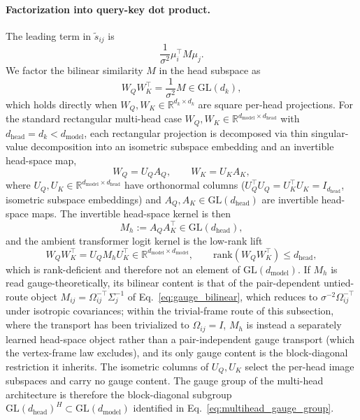 \documentclass[11pt]{article}
\begin{document}
\paragraph{Factorization into query-key dot product.}
The leading term in $\tilde{s}_{ij}$ is
\begin{equation}
\frac{1}{\sigma^2}\mu_i^\top M \mu_j.
\end{equation}
We factor the bilinear similarity $M$ in the head subspace as
\begin{equation}
W_Q W_K^\top = \frac{1}{\sigma^2} M \in \mathrm{GL}(d_k),
\label{eq:wqwk_square}
\end{equation}
which holds directly when $W_Q, W_K \in \mathbb{R}^{d_k \times d_k}$ are square per-head projections. For the standard rectangular multi-head case $W_Q, W_K \in \mathbb{R}^{d_{\text{model}}\times d_{\text{head}}}$ with $d_{\text{head}} = d_k < d_{\text{model}}$, each rectangular projection is decomposed via thin singular-value decomposition into an isometric subspace embedding and an invertible head-space map,
\begin{equation}
W_Q = U_Q A_Q, \qquad W_K = U_K A_K,
\label{eq:thin_svd_decomposition}
\end{equation}
where $U_Q, U_K \in \mathbb{R}^{d_{\text{model}}\times d_{\text{head}}}$ have orthonormal columns ($U_Q^\top U_Q = U_K^\top U_K = I_{d_{\text{head}}}$, isometric subspace embeddings) and $A_Q, A_K \in \mathrm{GL}(d_{\text{head}})$ are invertible head-space maps. The invertible head-space kernel is then
\begin{equation}
M_h := A_Q A_K^\top \in \mathrm{GL}(d_{\text{head}}),
\label{eq:head_space_kernel_participatory}
\end{equation}
and the ambient transformer logit kernel is the low-rank lift
\begin{equation}
W_Q W_K^\top = U_Q M_h U_K^\top \in \mathbb{R}^{d_{\text{model}}\times d_{\text{model}}}, \qquad \mathrm{rank}(W_Q W_K^\top) \le d_{\text{head}},
\label{eq:low_rank_lift}
\end{equation}
which is rank-deficient and therefore not an element of $\mathrm{GL}(d_{\text{model}})$. If $M_h$ is read gauge-theoretically, its bilinear content is that of the pair-dependent untied-route object $M_{ij} = \Omega_{ij}^{-\top}\Sigma_j^{-1}$ of Eq.~\eqref{eq:gauge_bilinear}, which reduces to $\sigma^{-2}\Omega_{ij}^{-\top}$ under isotropic covariances; within the trivial-frame route of this subsection, where the transport has been trivialized to $\Omega_{ij} = I$, $M_h$ is instead a separately learned head-space object rather than a pair-independent gauge transport (which the vertex-frame law excludes), and its only gauge content is the block-diagonal restriction it inherits. The isometric columns of $U_Q, U_K$ select the per-head image subspaces and carry no gauge content. The gauge group of the multi-head architecture is therefore the block-diagonal subgroup $\mathrm{GL}(d_{\text{head}})^H \subset \mathrm{GL}(d_{\text{model}})$ identified in Eq.~\eqref{eq:multihead_gauge_group}.
\end{document}
